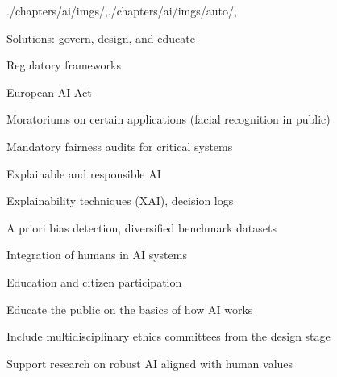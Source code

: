 \begin{graphicspathcontext}{{./chapters/ai/imgs/},{./chapters/ai/imgs/auto/},\old}

\begin{frame}[t]{Solutions: govern, design, and educate}
	\smaller
	\begin{block}{Regulatory frameworks}
		\begin{compactitemize}
		\item European AI Act
		\item Moratoriums on certain applications (facial recognition in public)
		\item Mandatory fairness audits for critical systems
		\end{compactitemize}
	\end{block}
	\begin{block}{Explainable and responsible AI}
		\begin{compactitemize}
		\item Explainability techniques (XAI), decision logs
		\item A priori bias detection, diversified benchmark datasets
		\item Integration of humans in AI systems
		\end{compactitemize}
	\end{block}
	\begin{block}{Education and citizen participation}
		\begin{compactitemize}
		\item Educate the public on the basics of how AI works
		\item Include multidisciplinary ethics committees from the design stage
		\item Support research on robust AI aligned with human values
		\end{compactitemize}
	\end{block}
\end{frame}

\end{graphicspathcontext}

\endinput

